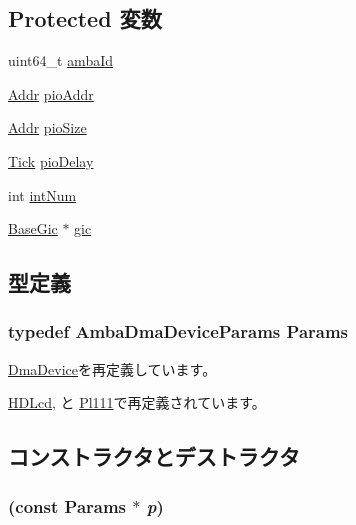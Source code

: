 \subsection*{Protected 変数}
\begin{DoxyCompactItemize}
\item 
uint64\_\-t \hyperlink{classAmbaDmaDevice_a3201bf99dce0ba0bb6a5fd367f3dd76e}{ambaId}
\item 
\hyperlink{base_2types_8hh_af1bb03d6a4ee096394a6749f0a169232}{Addr} \hyperlink{classAmbaDmaDevice_afa7a5450c2bc6f73bc056050c9177193}{pioAddr}
\item 
\hyperlink{base_2types_8hh_af1bb03d6a4ee096394a6749f0a169232}{Addr} \hyperlink{classAmbaDmaDevice_a390529fe683187c290621e1822e0d5d1}{pioSize}
\item 
\hyperlink{base_2types_8hh_a5c8ed81b7d238c9083e1037ba6d61643}{Tick} \hyperlink{classAmbaDmaDevice_ac8e969635a78ab9ab123904ccca434cc}{pioDelay}
\item 
int \hyperlink{classAmbaDmaDevice_a9bd4d49b818d8cf1a6dee0576d2ff039}{intNum}
\item 
\hyperlink{classBaseGic}{BaseGic} $\ast$ \hyperlink{classAmbaDmaDevice_a2e2266dca56928f63667e994933169ee}{gic}
\end{DoxyCompactItemize}


\subsection{型定義}
\hypertarget{classAmbaDmaDevice_ab612ceb7381438552927b7ed0aed5099}{
\subsubsection[{Params}]{\setlength{\rightskip}{0pt plus 5cm}typedef AmbaDmaDeviceParams {\bf Params}}}
\label{classAmbaDmaDevice_ab612ceb7381438552927b7ed0aed5099}


\hyperlink{classDmaDevice_aea7daf6105ab956443385f5f5a9b88c5}{DmaDevice}を再定義しています。

\hyperlink{classHDLcd_a31ccb03af3b5962a67bed42eca6ce2f0}{HDLcd}, と \hyperlink{classPl111_a98df8e62be26dfc2009a7e53d5d0841d}{Pl111}で再定義されています。

\subsection{コンストラクタとデストラクタ}
\hypertarget{classAmbaDmaDevice_a5dc78ee7b28b4b3effe7e28b09e6db48}{
\subsubsection[{AmbaDmaDevice}]{ (const {\bf Params} $\ast$ {\em p})}}
\label{classAmbaDmaDevice_a5dc78ee7b28b4b3effe7e28b09e6db48}



